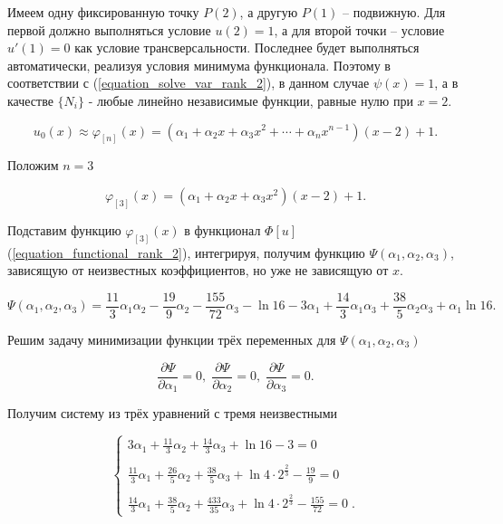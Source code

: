 \documentclass{article}
\begin{document}
Имеем одну фиксированную точку $P(2)$, а другую $P(1)$ – подвижную. Для первой должно выполняться условие $u(2)=1$, а для второй точки – условие $u'(1)=0$ как условие трансверсальности. Последнее будет выполняться автоматически, реализуя условия минимума функционала. Поэтому в соответствии с (\ref{equation_solve_var_rank_2}), в данном случае $\psi(x) = 1$, а в качестве $\lbrace N_{i} \rbrace$ - любые линейно независимые функции, равные нулю при $x=2$.

\begin{displaymath}
	u_{0}(x) \approx \varphi_{[n]}(x) = (\alpha_{1} + \alpha_{2}x + \alpha_{3}x^2 + \cdots + \alpha_{n}x^{n-1})(x-2)+1.
\end{displaymath}

\noindent Положим $n = 3$

\begin{displaymath}
	\varphi_{[3]}(x) = (\alpha_{1} + \alpha_{2}x + \alpha_{3}x^2)(x-2)+1.
\end{displaymath}

\noindent Подставим функцию $\varphi_{[3]}(x)$ в функционал $\Phi[u]$ (\ref{equation_functional_rank_2}), интегрируя, получим функцию $\Psi(\alpha_{1}, \alpha_{2}, \alpha_{3})$, зависящую от неизвестных коэффициентов, но уже не зависящую от $x$.

\begin{displaymath}
	\Psi(\alpha_{1}, \alpha_{2}, \alpha_{3}) = \frac{11}{3}\alpha_{1}\alpha_{2} - \frac{19}{9}\alpha_{2} - \frac{155}{72}\alpha_{3} - \ln{16} - 3\alpha_{1} + \frac{14}{3}\alpha_{1}\alpha_{3} + \frac{38}{5}\alpha_{2}\alpha_{3} + \alpha_{1}\ln{16}.
\end{displaymath}

Решим задачу минимизации функции трёх переменных для $\Psi(\alpha_{1}, \alpha_{2}, \alpha_{3})$

\begin{displaymath}
	\frac{\partial \Psi}{\partial \alpha_{1}} = 0, \;
	\frac{\partial \Psi}{\partial \alpha_{2}} = 0, \;
	\frac{\partial \Psi}{\partial \alpha_{3}} = 0.
\end{displaymath}

\noindent Получим систему из трёх уравнений с тремя неизвестными

\begin{displaymath}
	\begin{cases}
		3\alpha_{1} + \frac{11}{3}\alpha_{2} + \frac{14}{3}\alpha_{3} + \ln{16} - 3 = 0 \\
		\\
		\frac{11}{3}\alpha_{1} + \frac{26}{5}\alpha_{2} + \frac{38}{5}\alpha_{3} + \ln{4 \cdot 2^{\frac{2}{3}}} - \frac{19}{9} = 0 \\
		\\
		\frac{14}{3}\alpha_{1} + \frac{38}{5}\alpha_{2} + \frac{433}{35}\alpha_{3} + \ln{4 \cdot 2^{\frac{2}{3}}} - \frac{155}{72} = 0 \; .
	\end{cases}
\end{displaymath}
\end{document}
